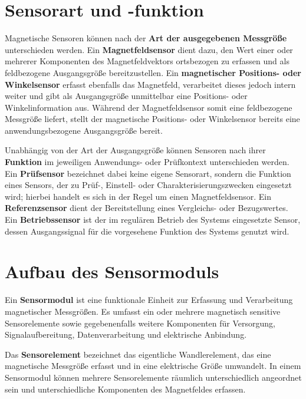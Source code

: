 \documentclass[
  ngerman,
  a4paper,
  twoside]{scrbook}
\begin{document}
\section{Sensorart und -funktion}\label{sec-08-sensorart_funktion}

Magnetische Sensoren können nach der \textbf{Art der ausgegebenen
Messgröße} unterschieden werden. Ein \textbf{Magnetfeldsensor} dient
dazu, den Wert einer oder mehrerer Komponenten des Magnetfeldvektors
ortsbezogen zu erfassen und als feldbezogene Ausgangsgröße
bereitzustellen. Ein \textbf{magnetischer Positions- oder Winkelsensor}
erfasst ebenfalls das Magnetfeld, verarbeitet dieses jedoch intern
weiter und gibt als Ausgangsgröße unmittelbar eine Positions- oder
Winkelinformation aus. Während der Magnetfeldsensor somit eine
feldbezogene Messgröße liefert, stellt der magnetische Positions- oder
Winkelsensor bereits eine anwendungsbezogene Ausgangsgröße bereit.

Unabhängig von der Art der Ausgangsgröße können Sensoren nach ihrer
\textbf{Funktion} im jeweiligen Anwendungs- oder Prüfkontext
unterschieden werden. Ein \textbf{Prüfsensor} bezeichnet dabei keine
eigene Sensorart, sondern die Funktion eines Sensors, der zu Prüf-,
Einstell- oder Charakterisierungszwecken eingesetzt wird; hierbei
handelt es sich in der Regel um einen Magnetfeldsensor. Ein
\textbf{Referenzsensor} dient der Bereitstellung eines Vergleichs- oder
Bezugswertes. Ein \textbf{Betriebssensor} ist der im regulären Betrieb
des Systems eingesetzte Sensor, dessen Ausgangssignal für die
vorgesehene Funktion des Systems genutzt wird.

\section{Aufbau des Sensormoduls}\label{sec-08-aufbau_sensormodul}

Ein \textbf{Sensormodul} ist eine funktionale Einheit zur Erfassung und
Verarbeitung magnetischer Messgrößen. Es umfasst ein oder mehrere
magnetisch sensitive Sensorelemente sowie gegebenenfalls weitere
Komponenten für Versorgung, Signalaufbereitung, Datenverarbeitung und
elektrische Anbindung.

Das \textbf{Sensorelement} bezeichnet das eigentliche Wandlerelement,
das eine magnetische Messgröße erfasst und in eine elektrische Größe
umwandelt. In einem Sensormodul können mehrere Sensorelemente räumlich
unterschiedlich angeordnet sein und unterschiedliche Komponenten des
Magnetfeldes erfassen.
\end{document}
